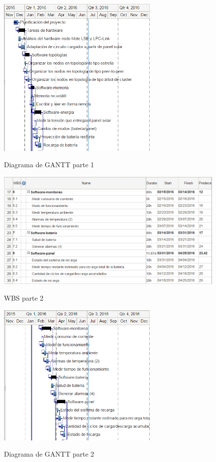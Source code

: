 \begin{figure}[h!]
	\centering
    \includegraphics[width=0.7\textwidth]{./Figures/gantt1.PNG}
	\label{fig:gantt1}
	\caption{Diagrama de GANTT parte 1}
\end{figure}

\begin{figure}[h!]
	\centering
    \includegraphics[width=1\textwidth]{./Figures/WBS2.PNG}
	\label{fig:WBS2}
	\caption{WBS parte 2}
\end{figure}

\begin{figure}[h!]
	\centering
    \includegraphics[width=0.7\textwidth]{./Figures/gantt2.PNG}
	\label{fig:gantt2}
	\caption{Diagrama de GANTT parte 2}
\end{figure}

